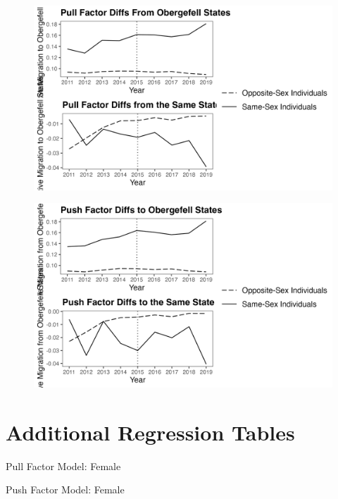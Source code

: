 \documentclass[12pt,letterpaper]{article}
\begin{document}
\begin{figure}[htbp]
    \centering
    \includegraphics[width=1\linewidth]{outputs/summary_stats/flows_post_diffs_app.png}
    \caption{}
    \label{fig: flows_post_diffs_app}
\end{figure}
\begin{figure}[htbp]
    \centering
    \includegraphics[width=1\linewidth]{outputs/summary_stats/flows_ante_diffs_app.png}
    \caption{}
    \label{fig: flows_ante_diffs_app}
\end{figure}

\FloatBarrier
\newpage
\section{Additional Regression Tables}
\begin{table}[htbp]
    \centering
    \caption{Pull Factor Model: Female}
    \label{tab: female_expost_model}
    
\end{table}
\begin{table}[htbp] %
    \centering
    \caption{Push Factor Model: Female}
    \label{tab: female_exante_model}
    
\end{table}
\end{document}
